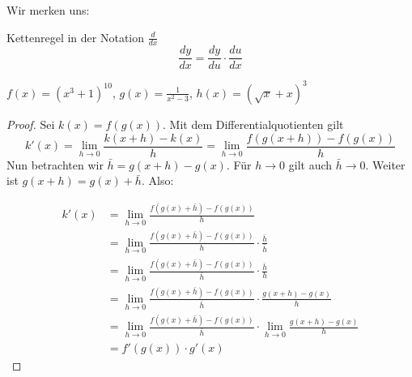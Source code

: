 Wir merken uns:
\begin{satz}
	{Kettenregel in der Notation $\frac{d}{dx}$}{}
	$$\frac{dy}{dx}= \frac{dy}{du}\cdot \frac{du}{dx}$$
\end{satz}

\begin{bsp}
	{$f(x)= (x^3+1)^{10}$, $g(x)=\frac{1}{x^2-3}$, $h(x)=\left(\sqrt{x}+x\right)^3 $ }{}

	\vspace{10cm}
\end{bsp}

\begin{proof}
	Sei $k(x) = f(g(x))$. Mit dem Differentialquotienten gilt
	$$k'(x) = \lim_{h\rightarrow0}\frac{k(x+h)-k(x)}{h} = \lim_{h\rightarrow0}\frac{f(g(x+h))-f(g(x))}{h}$$
	Nun betrachten wir $\bar h = g(x+h)-g(x)$. Für $h\rightarrow0$ gilt auch $\bar h \rightarrow 0$.  Weiter ist $g(x+h) = g(x) + \bar h$. Also:

	\begin{align*}
		k'(x) & = \lim_{h\rightarrow0} \frac{f(g(x)+\bar h) -f(g(x))}{h}                                                        \\
		      & = \lim_{h\rightarrow0} \frac{f(g(x)+\bar h) -f(g(x))}{h} \cdot \frac{\bar h}{ \bar h}                           \\
		      & = \lim_{h\rightarrow0} \frac{f(g(x)+\bar h) -f(g(x))}{\bar h} \cdot \frac{\bar h}{h}                            \\
		      & = \lim_{h\rightarrow0} \frac{f(g(x)+\bar h) -f(g(x))}{\bar h} \cdot \frac{g(x+h)-g(x)}{ h}                      \\
		      & = \lim_{h\rightarrow0} \frac{f(g(x)+\bar h) -f(g(x))}{\bar h} \cdot \lim_{h\rightarrow0} \frac{g(x+h)-g(x)}{ h} \\
		      & = f'(g(x)) \cdot g'(x)
	\end{align*}
\end{proof}

